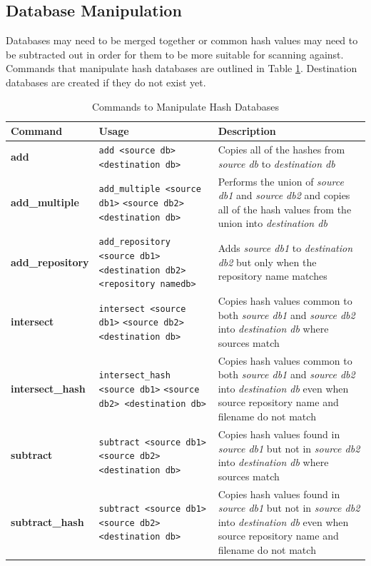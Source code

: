 \documentclass[11pt,fleqn]{article} %
\begin{document}
\subsection{Database Manipulation}
\label{DatabaseManipulation}
Databases may need to be merged together or common hash values may need to be subtracted out in order for them to be more suitable for scanning against.
Commands that manipulate hash databases are outlined in Table \ref{tab:databaseManipulation}.
Destination databases are created if they do not exist yet.

\begin{table}[!ht]
\centering
\caption{Commands to Manipulate Hash Databases}
\label{tab:databaseManipulation}
\begin{tabular}{|p{3.5 cm}|p{6 cm}|p{4 cm}|}
\hline \hline
\textbf{Command} & \textbf{Usage} & \textbf{Description} \\
\hline
\textbf{add} & \verb+add <source db>+ \verb+<destination db>+ & Copies all of the hashes from \textit{source db} to \textit{destination db}\\
\hline
\textbf{add\_multiple} &  \verb+add_multiple <source db1>+ \verb+<source db2> <destination db>+ & Performs the union of \textit{source db1} and \textit{source db2} and copies all of the hash values from the union into \textit{destination db}\\
\hline
\textbf{add\_repository} & \verb+add_repository <source db1>+ \verb+<destination db2>+ \verb+<repository namedb>+ & Adds \textit{source db1} to \textit{destination db2} but only when the repository name matches\\
\hline
\textbf{intersect} & \verb+intersect <source db1>+ \verb+<source db2> <destination db>+ &   Copies hash values common to both \textit{source db1} and \textit{source db2} into \textit{destination db} where sources match\\
\hline
\textbf{intersect\_hash} & \verb+intersect_hash <source db1>+ \verb+<source db2> <destination db>+ &   Copies hash values common to both \textit{source db1} and \textit{source db2} into \textit{destination db} even when source repository name and filename do not match\\
\hline
\textbf{subtract} & \verb+subtract <source db1>+ \verb+<source db2> <destination db>+&   Copies hash values found in \textit{source db1} but not in \textit{source db2} into \textit{destination db} where sources match\\
\hline
\textbf{subtract\_hash} & \verb+subtract <source db1>+ \verb+<source db2> <destination db>+&   Copies hash values found in \textit{source db1} but not in \textit{source db2} into \textit{destination db} even when source repository name and filename do not match\\

\end{tabular}
\end{table}
\end{document}
